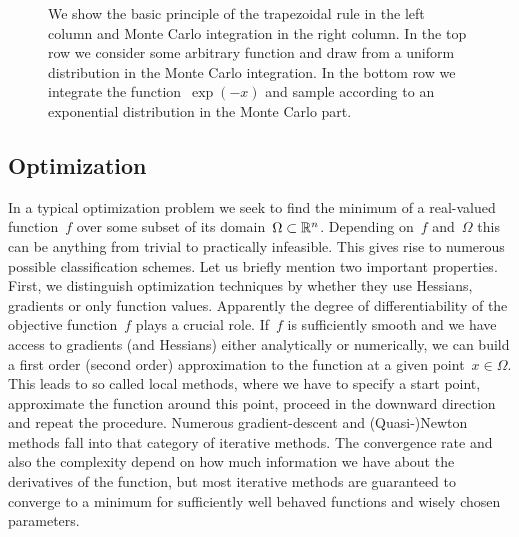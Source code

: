 \begin{figure}
%
  \caption{We show the basic principle of the trapezoidal rule in the left
  column and Monte Carlo integration in the right column. In the top row we
  consider some arbitrary function and draw from a uniform distribution in the
  Monte Carlo integration. In the bottom row we integrate the
  function~$\exp(-x)$ and sample according to an exponential distribution in the
  Monte Carlo part.}
\label{fig:int}
\end{figure}




\subsection{Optimization}

In a typical optimization problem we seek to find the minimum of a real-valued
function~$f$ over some subset of its domain~$\Omega \subset \mathbb{R}^n$. Depending
on~$f$ and~$\Omega$ this can be anything from trivial to practically infeasible.
This gives rise to numerous possible classification schemes. Let us briefly
mention two important properties. First, we distinguish optimization techniques
by whether they use Hessians, gradients or only function values. Apparently the
degree of differentiability of the objective function~$f$ plays a crucial role.
If~$f$ is sufficiently smooth and we have access to gradients (and Hessians)
either analytically or numerically, we can build a first order (second order)
approximation to the function at a given point~$x \in \Omega$. This leads to so
called local methods, where we have to specify a start point, approximate the
function around this point, proceed in the downward direction and repeat the
procedure. Numerous gradient-descent and (Quasi-)Newton methods fall into that
category of iterative methods. The convergence rate and also the complexity
depend on how much information we have about the derivatives of the function,
but most iterative methods are guaranteed to converge to a minimum for
sufficiently well behaved functions and wisely chosen parameters.

